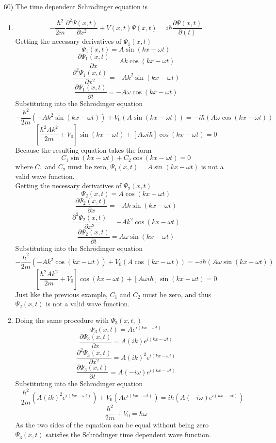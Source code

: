 \documentclass[12pt]{2620hw}
\begin{document}
\begin{enumerate}
\begin{enumerate}
\end{enumerate}

\item [60)] The time dependent Schrödinger equation is 

\begin{enumerate}
\item
	\[
		- \frac{\hbar^2}{2m}\frac{\partial^2 \Psi(x, t)}{\partial x^2} + V(x,t)\Psi(x,t) = i \hbar \frac{\partial \Psi(x, t)}{\partial(t)}
	\]
	Getting the necessary derivatives of $\Psi_1(x, t)$
	\[
		\Psi_1(x, t) = A\sin(kx - \omega t)
	\]
	\[
		\frac{\partial \Psi_1(x, t)}{\partial x} = Ak\cos(kx - \omega t)
	\]
	\[
		\frac{\partial^2 \Psi_1(x, t)}{\partial x^2} = -Ak^2\sin(kx - \omega t)
	\]
	\[
		\frac{\partial \Psi_1(x, t)}{\partial t} = -A\omega\cos(kx - \omega t)
	\]
	Substituting into the Schrödinger equation
	\[
		- \frac{\hbar^2}{2m} (-Ak^2\sin(kx - \omega t)) + V_0 ( A\sin(kx - \omega t) ) =  - i \hbar (A\omega\cos(kx - \omega t))
	\]
	\[
		\left[\frac{\hbar^2Ak^2}{2m} + V_0 \right]\sin(kx - \omega t) + \left[ A\omega i\hbar\right]\cos(kx - \omega t) = 0
	\]
	Because the resulting equation takes the form 
	\[
		C_1\sin(kx - \omega t) + C_2\cos(kx - \omega t) = 0
	\] 
	where $C_1$ and $C_2$ must be zero, $\Psi_1(x, t) = A\sin(kx - \omega t)$ is not a valid wave function.\\

	Getting the necessary derivatives of $\Psi_2(x, t)$
	\[
		\Psi_2(x, t) = A\cos(kx - \omega t)
	\]
	\[
		\frac{\partial \Psi_2(x, t)}{\partial x} = -Ak\sin(kx - \omega t)
	\]
	\[
		\frac{\partial^2 \Psi_2(x, t)}{\partial x^2} = -Ak^2\cos(kx - \omega t)
	\]
	\[
			\frac{\partial \Psi_2(x, t)}{\partial t} = A\omega\sin(kx - \omega t)
	\]
	Substituting into the Schrödinger equation
	\[
		- \frac{\hbar^2}{2m}( -Ak^2\cos(kx - \omega t) ) + V_0 (A\cos(kx - \omega t)) = -i \hbar ( A\omega\sin(kx - \omega t))
	\]
	\[
		 \left[ \frac{\hbar^2Ak^2}{2m} + V_0 \right] \cos(kx - \omega t)  + [ A \omega i \hbar ]\sin(kx - \omega t) = 0
	\]
	Just like the previous example, $C_1$ and $C_2$ must be zero, and thus $\Psi_2(x,t)$ is not a valid wave function.
	
	\item Doing the same procedure with $\Psi_3(x, t,)$
	\[
		\Psi_3(x, t) = Ae^{i(kx-\omega t)}
	\]
	\[
		\frac{\partial \Psi_3(x, t)}{\partial x} = A(ik)e^{i(kx-\omega t)}
	\]
	\[
		\frac{\partial^2 \Psi_3(x, t)}{\partial x^2} = A(ik)^2e^{i(kx -\omega t)}
	\]
	\[
			\frac{\partial \Psi_3(x, t)}{\partial t} = A(-i\omega)e^{i(kx - \omega t)}
	\]
	Substituting into the Schrödinger equation
	\[
			- \frac{\hbar^2}{2m} \left( A(ik)^2e^{i(kx -\omega t)} \right)	+ V_0 \left(  Ae^{i(kx-\omega t)} \right) = i\hbar \left(  A(-i\omega)e^{i(kx - \omega t)} \right)
	\]
	\[
		\frac{\hbar^2}{2m} + V_0 = \hbar \omega
	\]
	As the two sides of the equation can be equal without being zero $\Psi_3(x, t)$ satisfies the Schrödinger time dependent wave function.


\end{enumerate}
\end{enumerate}
\end{document}
